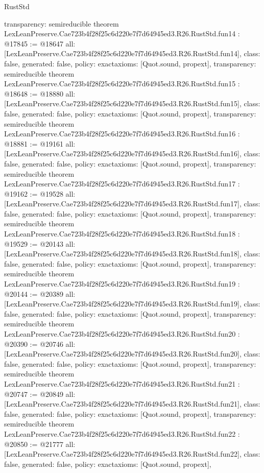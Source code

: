 \begin{lexlean}{RustStd}
\begin{coremodule}
{  transparency: semireducible
}
theorem LexLeanPreserve.Cae723b4f28f25c6d220e7f7d64945ed3.R26.RustStd.fun14 : @17845 := @18647 {
  all: [LexLeanPreserve.Cae723b4f28f25c6d220e7f7d64945ed3.R26.RustStd.fun14],
  class: false,
  generated: false,
  policy: exact{axioms: [Quot.sound, propext]},
  transparency: semireducible
}
theorem LexLeanPreserve.Cae723b4f28f25c6d220e7f7d64945ed3.R26.RustStd.fun15 : @18648 := @18880 {
  all: [LexLeanPreserve.Cae723b4f28f25c6d220e7f7d64945ed3.R26.RustStd.fun15],
  class: false,
  generated: false,
  policy: exact{axioms: [Quot.sound, propext]},
  transparency: semireducible
}
theorem LexLeanPreserve.Cae723b4f28f25c6d220e7f7d64945ed3.R26.RustStd.fun16 : @18881 := @19161 {
  all: [LexLeanPreserve.Cae723b4f28f25c6d220e7f7d64945ed3.R26.RustStd.fun16],
  class: false,
  generated: false,
  policy: exact{axioms: [Quot.sound, propext]},
  transparency: semireducible
}
theorem LexLeanPreserve.Cae723b4f28f25c6d220e7f7d64945ed3.R26.RustStd.fun17 : @19162 := @19528 {
  all: [LexLeanPreserve.Cae723b4f28f25c6d220e7f7d64945ed3.R26.RustStd.fun17],
  class: false,
  generated: false,
  policy: exact{axioms: [Quot.sound, propext]},
  transparency: semireducible
}
theorem LexLeanPreserve.Cae723b4f28f25c6d220e7f7d64945ed3.R26.RustStd.fun18 : @19529 := @20143 {
  all: [LexLeanPreserve.Cae723b4f28f25c6d220e7f7d64945ed3.R26.RustStd.fun18],
  class: false,
  generated: false,
  policy: exact{axioms: [Quot.sound, propext]},
  transparency: semireducible
}
theorem LexLeanPreserve.Cae723b4f28f25c6d220e7f7d64945ed3.R26.RustStd.fun19 : @20144 := @20389 {
  all: [LexLeanPreserve.Cae723b4f28f25c6d220e7f7d64945ed3.R26.RustStd.fun19],
  class: false,
  generated: false,
  policy: exact{axioms: [Quot.sound, propext]},
  transparency: semireducible
}
theorem LexLeanPreserve.Cae723b4f28f25c6d220e7f7d64945ed3.R26.RustStd.fun20 : @20390 := @20746 {
  all: [LexLeanPreserve.Cae723b4f28f25c6d220e7f7d64945ed3.R26.RustStd.fun20],
  class: false,
  generated: false,
  policy: exact{axioms: [Quot.sound, propext]},
  transparency: semireducible
}
theorem LexLeanPreserve.Cae723b4f28f25c6d220e7f7d64945ed3.R26.RustStd.fun21 : @20747 := @20849 {
  all: [LexLeanPreserve.Cae723b4f28f25c6d220e7f7d64945ed3.R26.RustStd.fun21],
  class: false,
  generated: false,
  policy: exact{axioms: [Quot.sound, propext]},
  transparency: semireducible
}
theorem LexLeanPreserve.Cae723b4f28f25c6d220e7f7d64945ed3.R26.RustStd.fun22 : @20850 := @21777 {
  all: [LexLeanPreserve.Cae723b4f28f25c6d220e7f7d64945ed3.R26.RustStd.fun22],
  class: false,
  generated: false,
  policy: exact{axioms: [Quot.sound, propext]},
}
\end{coremodule}
\end{lexlean}
